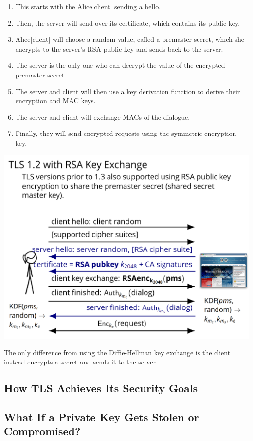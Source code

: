 \documentclass[11pt]{article} %
\begin{document}
{\begin{enumerate}
  \item This starts with the Alice[client] sending a hello.
  \item Then, the server will send over its certificate, which contains its 
  public key.
  \item Alice[client] will choose a random value, called a premaster secret, 
  which she encrypts to the server's RSA public key and sends back to the 
  server.
  \item The server is the only one who can decrypt the value of the encrypted 
  premaster secret.
  \item The server and client will then use a key derivation function to 
  derive their encryption and MAC keys.
  \item The server and client will exchange MACs of the dialogue.
  \item Finally, they will send encrypted requests using the symmetric 
  encryption key.
\end{enumerate}

\includegraphics[scale=.6]{./TLS_RSA.png}

The only difference from using the Diffie-Hellman key exchange is the client 
instead encrypts a secret and sends it to the server.

\newpage
\subsection{How TLS Achieves Its Security Goals}

\subsection{What If a Private Key Gets Stolen or Compromised?}

}
\end{document}
